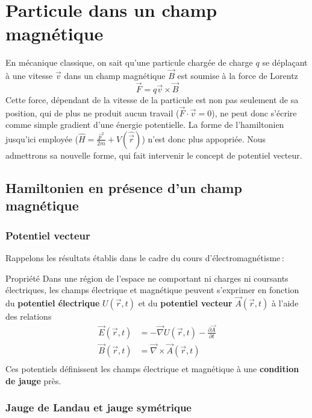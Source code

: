 \section{Particule dans un champ magnétique}

    En mécanique classique, on sait qu’une particule chargée de charge $q$ se déplaçant à une vitesse $\vec{v}$ dans un champ magnétique $\vec{B}$ est soumise à la force de Lorentz 
    \[ \vec{F} = q \vec{v} \times \vec{B} \]   
    Cette force, dépendant de la vitesse de la particule est non pas seulement de sa position, qui de plus ne produit aucun travail ($\vec{F} \cdot \vec{v} = 0$), ne peut donc s’écrire comme simple gradient d’une énergie potentielle. La forme de l’hamiltonien jusqu’ici employée ($\hat{H} = \frac{\hat{p}^2}{2m} + V(\hat{\vec{r}})$) n’est donc plus appopriée. Nous admettrons sa nouvelle forme, qui fait intervenir le concept de potentiel vecteur.

    \subsection{Hamiltonien en présence d’un champ magnétique}

        \subsubsection{Potentiel vecteur}

    Rappelons les résultats établis dans le cadre du cours d’électromagnétisme :

    \begin{omed}{Propriété}
        Dans une région de l’espace ne comportant ni charges ni coursants électriques, les champs électrique et magnétique peuvent s’exprimer en fonction du \textbf{potentiel électrique} $U(\vec{r}, t)$ et du \textbf{potentiel vecteur} $\vec{A}(\vec{r},t)$ à l’aide des relations 
        \begin{align*}
            \vec{E}(\vec{r},t) &= - \vec{\nabla} U(\vec{r},t) - \frac{\partial \vec{A}}{\partial t} \\
            \vec{B}(\vec{r},t) &= \vec{\nabla} \times \vec{A}(\vec{r},t) \\
        \end{align*}
        Ces potentiels définissent les champs électrique et magnétique à une \textbf{condition de jauge} près.
    \end{omed}

        \subsubsection{Jauge de Landau et jauge symétrique}

